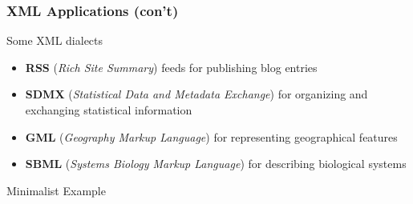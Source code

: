\documentclass{beamer}\usepackage[]{graphicx}\usepackage[]{color}
\begin{document}
\begin{frame}
\frametitle{XML Applications (con't)}

\begin{block}{Some XML dialects}
\begin{itemize}
 \item \textbf{RSS} (\textit{Rich Site Summary}) feeds for publishing blog entries
 \item \textbf{SDMX} (\textit{Statistical Data and Metadata Exchange}) for organizing and exchanging statistical information
 \item \textbf{GML} (\textit{Geography Markup Language}) for representing geographical features
 \item \textbf{SBML} (\textit{Systems Biology Markup Language}) for describing biological systems
\end{itemize}
\end{block}

\end{frame}


\begin{frame}
 \begin{center}
  \Huge{\textcolor{mandarina}{Minimalist Example}}
 \end{center}
\end{frame}


{ %
    \begin{frame}[plain]
     \end{frame}
}
\end{document}
